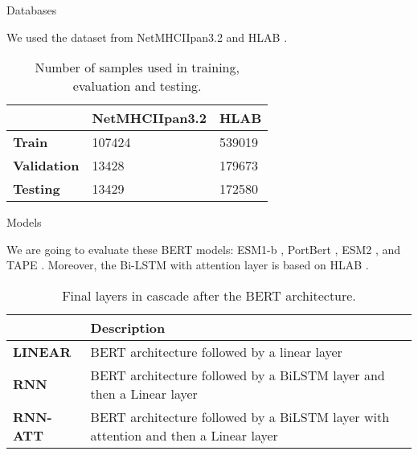 \documentclass[10pt]{beamer}
\newcommand{\1}{
	\setbeamertemplate{background}{
		\texttt{[image: img/1]}
		\tikz[overlay] \fill[fill opacity=0.75,fill=white] (0,0) rectangle (-\paperwidth,\paperheight);
	}
}
\begin{document}
\begin{frame}{Databases}{}
	
We used the dataset from NetMHCIIpan3.2 \cite{jensen2018improved} and HLAB  \cite{zhang2022hlab}.

\begin{table}[h]
	\centering
	\caption{Number of samples used in training, evaluation and testing.}
	\setlength{\tabcolsep}{0.8em} %
	{\renewcommand{\arraystretch}{1.3}%
		
		\begin{tabular}{lll}
			& \textbf{NetMHCIIpan3.2} & \textbf{HLAB} \\ \hline
			\textbf{Train}      & 107424  &   539019   \\
			\textbf{Validation} & 13428  &   179673   \\
			\textbf{Testing}    & 13429  &  172580   
		\end{tabular}
		
	}
\end{table}

\end{frame}

\begin{frame}{Models}{}
	
	We are going to evaluate these BERT models: ESM1-b \cite{rives2021biological}, PortBert \cite{elnaggar2007prottrans}, ESM2 \cite{lin2023evolutionary}, and TAPE \cite{rao2019evaluating}. Moreover, the Bi-LSTM with attention layer is based on HLAB \cite{zhang2022hlab}.
	
	\begin{table}[h]
		\centering
		\caption{Final layers in cascade after the BERT architecture.}
		\setlength{\tabcolsep}{0.8em} %
		{\renewcommand{\arraystretch}{1.3}%
			
			\begin{tabular}{lp{6cm}}
				& \textbf{Description}\\ \hline
				\textbf{LINEAR}      & BERT architecture followed by a linear layer        \\
				\textbf{RNN} & BERT architecture followed by a BiLSTM layer and then a Linear layer        \\
				\textbf{RNN-ATT}    & BERT architecture followed by a BiLSTM layer with attention and then a Linear layer       
			\end{tabular}
			
		}
	\end{table}
	
\end{frame}
\end{document}
